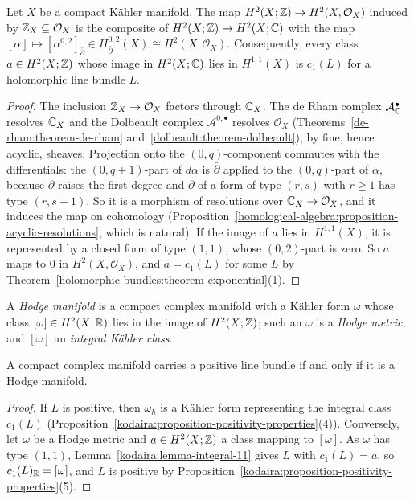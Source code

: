 \begin{lemma}\label{kodaira:lemma-integral-11}
Let $X$ be a compact K\"ahler manifold. The map $H^2(X; \mathbb{Z}) \to H^2(X, \mathcal{O}_X)$ induced by $\mathbb{Z}_X \subseteq \mathcal{O}_X$ is the
composite of $H^2(X; \mathbb{Z}) \to H^2(X; \mathbb{C})$ with the map $[\alpha] \mapsto [\alpha^{0,2}]_{\bar\partial} \in H^{0,2}_{\bar\partial}(X) \cong H^2(X, \mathcal{O}_X)$.
Consequently, every class $a \in H^2(X; \mathbb{Z})$ whose image in $H^2(X; \mathbb{C})$ lies in $H^{1,1}(X)$ is $c_1(L)$ for a holomorphic line bundle $L$.
\end{lemma}

\begin{proof}
The inclusion $\mathbb{Z}_X \to \mathcal{O}_X$ factors through $\mathbb{C}_X$. The de Rham complex $\mathcal{A}^\bullet_{\mathbb{C}}$ resolves $\mathbb{C}_X$ and the
Dolbeault complex $\mathcal{A}^{0,\bullet}$ resolves $\mathcal{O}_X$ (Theorems~\ref{de-rham:theorem-de-rham} and~\ref{dolbeault:theorem-dolbeault}),
by fine, hence acyclic, sheaves. Projection onto the $(0,q)$-component commutes with the differentials: the $(0, q+1)$-part of $d\alpha$ is
$\bar\partial$ applied to the $(0,q)$-part of $\alpha$, because $\partial$ raises the first degree and $\bar\partial$ of a form of type $(r, s)$
with $r \geq 1$ has type $(r, s+1)$. So it is a morphism of resolutions over $\mathbb{C}_X \to \mathcal{O}_X$, and it induces the map on cohomology
(Proposition~\ref{homological-algebra:proposition-acyclic-resolutions}, which is natural). If the image of $a$ lies in $H^{1,1}(X)$, it is
represented by a closed form of type $(1,1)$, whose $(0,2)$-part is zero. So $a$ maps to $0$ in $H^2(X, \mathcal{O}_X)$, and $a = c_1(L)$ for
some $L$ by Theorem~\ref{holomorphic-bundles:theorem-exponential}(1).
\end{proof}

\begin{definition}\label{kodaira:definition-hodge-manifold}
A \emph{Hodge manifold} is a compact complex manifold with a K\"ahler form $\omega$ whose class $[\omega] \in H^2(X; \mathbb{R})$ lies in the image
of $H^2(X; \mathbb{Z})$; such an $\omega$ is a \emph{Hodge metric}, and $[\omega]$ an \emph{integral K\"ahler class}.
\end{definition}

\begin{corollary}\label{kodaira:corollary-positive-iff-hodge}
A compact complex manifold carries a positive line bundle if and only if it is a Hodge manifold.
\end{corollary}

\begin{proof}
If $L$ is positive, then $\omega_h$ is a K\"ahler form representing the integral class $c_1(L)$
(Proposition~\ref{kodaira:proposition-positivity-properties}(4)). Conversely, let $\omega$ be a Hodge metric and $a \in H^2(X; \mathbb{Z})$ a class
mapping to $[\omega]$. As $\omega$ has type $(1,1)$, Lemma~\ref{kodaira:lemma-integral-11} gives $L$ with $c_1(L) = a$, so $c_1(L)_{\mathbb{R}} = [\omega]$,
and $L$ is positive by Proposition~\ref{kodaira:proposition-positivity-properties}(5).
\end{proof}


